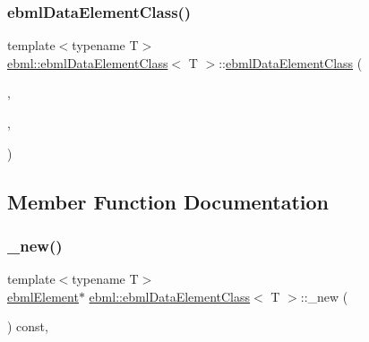 \mbox{\label{classebml_1_1ebmlDataElementClass_a3af7912dc41d400db7b1347766fef924}} 
\subsubsection{\texorpdfstring{ebml\+Data\+Element\+Class()}{ebmlDataElementClass()}\hspace{0.1cm}{\footnotesize\ttfamily [6/6]}}
{\footnotesize\ttfamily template$<$typename T$>$ \\
\mbox{\hyperlink{classebml_1_1ebmlDataElementClass}{ebml\+::ebml\+Data\+Element\+Class}}$<$ T $>$\+::\mbox{\hyperlink{classebml_1_1ebmlDataElementClass}{ebml\+Data\+Element\+Class}} (\begin{DoxyParamCaption}\item[{\mbox{\hyperlink{namespaceebml_a86c5f604ddf12a74aa9812e997a58691}{ebml\+I\+D\+\_\+t}}}]{,  }\item[{const std\+::wstring \&}]{,  }\item[{T \&\&}]{ }\end{DoxyParamCaption})}



\subsection{Member Function Documentation}
\mbox{\label{classebml_1_1ebmlDataElementClass_a022ddc37a9bf678de66dab9157d08b9a}} 
\subsubsection{\texorpdfstring{\+\_\+new()}{\_new()}}
{\footnotesize\ttfamily template$<$typename T$>$ \\
\mbox{\hyperlink{classebml_1_1ebmlElement}{ebml\+Element}}$\ast$ \mbox{\hyperlink{classebml_1_1ebmlDataElementClass}{ebml\+::ebml\+Data\+Element\+Class}}$<$ T $>$\+::\+\_\+new (\begin{DoxyParamCaption}{ }\end{DoxyParamCaption}) const\hspace{0.3cm}{\ttfamily [protected]}, {\ttfamily [virtual]}}



